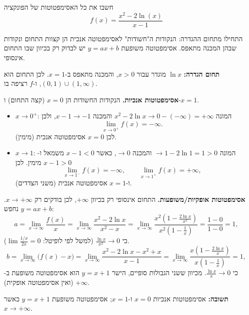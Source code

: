 
\begin{question}
חשבו את כל האסימפטוטות של הפונקציה
\[ f(x) = \frac{x^2 - 2\ln(x)}{x - 1} \]
\end{question}

\begin{hint}
התחילו מתחום ההגדרה: הנקודות ה"חשודות" לאסימפטוטה אנכית הן קצוות התחום ונקודות שבהן המכנה מתאפס. אסימפטוטה משופעת $y = ax + b$ יש לבדוק רק בכיוון שבו התחום אינסופי.
\end{hint}

\begin{solution}
\textbf{תחום הגדרה:} $\ln x$ מוגדר עבור $x > 0$, והמכנה מתאפס ב-$x = 1$. לכן התחום הוא $(0,1)\cup(1,\infty)$, ו-$f$ רציפה בו.

\textbf{אסימפטוטות אנכיות.} הנקודות החשודות הן $x = 0$ (קצה התחום) ו-$x = 1$.
\begin{itemize}
  \item $x \to 0^+$: המונה $x^2 - 2\ln x \to 0 - (-\infty) = +\infty$ והמכנה $x - 1 \to -1$, ולכן
  \[ \lim_{x\to 0^+} f(x) = -\infty. \]
  לכן $x = 0$ אסימפטוטה אנכית (מימין).
  \item $x \to 1$: המונה $\to 1 - 2\ln 1 = 1 > 0$ והמכנה $\to 0$, כאשר $x - 1 < 0$ משמאל ו-$x - 1 > 0$ מימין. לכן
  \[ \lim_{x\to 1^-} f(x) = -\infty, \qquad \lim_{x\to 1^+} f(x) = +\infty, \]
  ו-$x = 1$ אסימפטוטה אנכית (משני הצדדים).
\end{itemize}

\textbf{אסימפטוטות אופקיות/משופעות.} התחום אינסופי רק בכיוון $+\infty$, לכן בודקים רק $x \to +\infty$. נחפש $y = ax + b$:
\[ a = \lim_{x\to\infty} \frac{f(x)}{x} = \lim_{x\to\infty} \frac{x^2 - 2\ln x}{x^2 - x}
     = \lim_{x\to\infty} \frac{x^2\left(1 - \frac{2\ln x}{x^2}\right)}{x^2\left(1 - \frac{1}{x}\right)} = \frac{1 - 0}{1 - 0} = 1, \]
כי $\frac{\ln x}{x^2} \to 0$ (למשל לפי לופיטל: $\lim \frac{1/x}{2x} = 0$).
\[ b = \lim_{x\to\infty} \bigl(f(x) - x\bigr) = \lim_{x\to\infty} \frac{x^2 - 2\ln x - x^2 + x}{x - 1}
     = \lim_{x\to\infty} \frac{x\left(1 - \frac{2\ln x}{x}\right)}{x\left(1 - \frac{1}{x}\right)} = 1, \]
כי $\frac{\ln x}{x} \to 0$. מכיוון ששני הגבולות סופיים, הישר $y = x + 1$ הוא אסימפטוטה משופעת ב-$+\infty$ (ואין אסימפטוטה אופקית).

\textbf{תשובה:} אסימפטוטות אנכיות $x = 0$ ו-$x = 1$; אסימפטוטה משופעת $y = x + 1$ כאשר $x \to +\infty$.
\end{solution}
